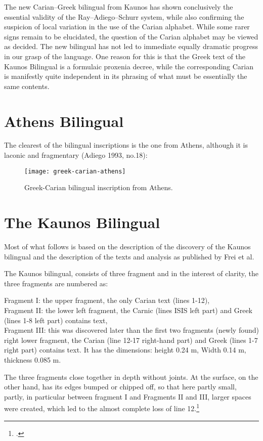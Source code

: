 The new Carian–Greek bilingual from Kaunos has shown conclusively the essential validity
of the Ray–Adiego–Schurr system, while also confirming the suspicion of local variation 
in the use of the Carian alphabet. While some rarer signs remain to be elucidated, the question
of the Carian alphabet may be viewed as decided. The new bilingual has not led to
immediate equally dramatic progress in our grasp of the language. One reason for this is
that the Greek text of the Kaunos Bilingual is a formulaic proxenia decree, while the corresponding
Carian is manifestly quite independent in its phrasing of what must be essentially
the same contents. 

\section{Athens Bilingual}

The clearest of the bilingual inscriptions is the one from Athens, although it is laconic and fragmentary (Adiego 1993, no.18):

\begin{figure}[htbp] 
\centering
\texttt{[image: greek-carian-athens]}
\caption{Greek-Carian bilingual inscription from Athens.}
\end{figure}

\section{The Kaunos Bilingual}

Most of what follows is based on the description of the discovery of the Kaunos bilingual
and the description of the texts and analysis as published by Frei et al.

The Kaunos bilingual, consists of three fragment and in the interest 
of clarity, the three fragments are numbered as:

Fragment I: the upper fragment, the only Carian text (lines 1-12),\\
Fragment II: the lower left fragment, the Carnic (lines ISIS left part) and Greek (lines 1-8 left part) contains text,\\
Fragment III: this was discovered later than the first two fragments (newly found) right lower fragment, the Carian (line 12-17 right-hand part) and Greek (lines 1-7 right part) contains text. It has the dimensions: height 0.24 m, Width 0.14 m, thickness 0.085 m.

The three fragments close together in depth without joints. At the surface, on the other hand, has its edges bumped or chipped off, so that here partly small, partly, in particular between fragment I and Fragments II and III, larger spaces were created,
which led to the almost complete loss of line 12.\footcite{frei1997}

